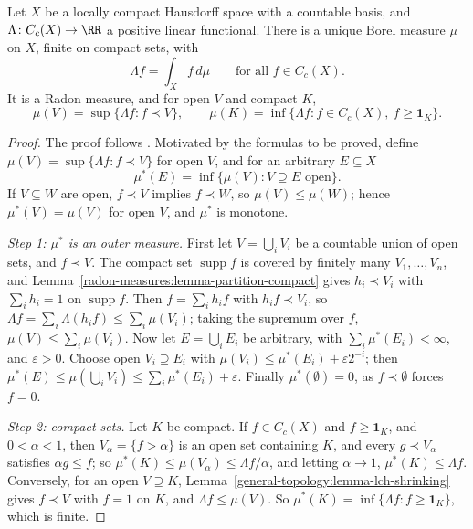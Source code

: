 \begin{theorem}\label{radon-measures:theorem-riesz-markov}
Let $X$ be a locally compact Hausdorff space with a countable basis, and $\Lambda \colon C_c(X) \to \RR$ a positive linear functional. There is a unique Borel measure $\mu$ on $X$, finite on compact
sets, with
\[
\Lambda f = \int_Xf\,d\mu \qquad \text{for all } f \in C_c(X).
\]
It is a Radon measure, and for open $V$ and compact $K$,
\[
\mu(V) = \sup\{\Lambda f : f \prec V\}, \qquad \mu(K) = \inf\{\Lambda f : f \in C_c(X),\ f \geq \mathbf{1}_K\}.
\]
\end{theorem}

\begin{proof}
The proof follows \cite[Theorem 2.14]{rudin-rca}. Motivated by the formulas to be proved, define $\mu(V) = \sup\{\Lambda f : f \prec V\}$ for open $V$, and for an arbitrary $E \subseteq X$
\[
\mu^*(E) = \inf\{\mu(V) : V \supseteq E \text{ open}\}.
\]
If $V \subseteq W$ are open, $f \prec V$ implies $f \prec W$, so $\mu(V) \leq \mu(W)$; hence $\mu^*(V) = \mu(V)$ for open $V$, and $\mu^*$ is monotone.

\emph{Step 1: $\mu^*$ is an outer measure.} First let $V = \bigcup_iV_i$ be a countable union of open sets, and $f \prec V$. The compact set $\operatorname{supp}f$ is covered by finitely many
$V_1, \ldots, V_n$, and Lemma~\ref{radon-measures:lemma-partition-compact} gives $h_i \prec V_i$ with $\sum_ih_i = 1$ on $\operatorname{supp}f$. Then $f = \sum_ih_if$ with $h_if \prec V_i$, so
$\Lambda f = \sum_i\Lambda(h_if) \leq \sum_i\mu(V_i)$; taking the supremum over $f$, $\mu(V) \leq \sum_i\mu(V_i)$. Now let $E = \bigcup_iE_i$ be arbitrary, with $\sum_i\mu^*(E_i) < \infty$, and
$\varepsilon > 0$. Choose open $V_i \supseteq E_i$ with $\mu(V_i) \leq \mu^*(E_i) + \varepsilon2^{-i}$; then
$\mu^*(E) \leq \mu(\bigcup_iV_i) \leq \sum_i\mu^*(E_i) + \varepsilon$. Finally $\mu^*(\emptyset) = 0$, as $f \prec \emptyset$ forces $f = 0$.

\emph{Step 2: compact sets.} Let $K$ be compact. If $f \in C_c(X)$ and $f \geq \mathbf{1}_K$, and $0 < \alpha < 1$, then $V_\alpha = \{f > \alpha\}$ is an open set containing $K$, and every $g \prec V_\alpha$
satisfies $\alpha g \leq f$; so $\mu^*(K) \leq \mu(V_\alpha) \leq \Lambda f/\alpha$, and letting $\alpha \to 1$, $\mu^*(K) \leq \Lambda f$. Conversely, for an open $V \supseteq K$,
Lemma~\ref{general-topology:lemma-lch-shrinking} gives $f \prec V$ with $f = 1$ on $K$, and $\Lambda f \leq \mu(V)$. So $\mu^*(K) = \inf\{\Lambda f : f \geq \mathbf{1}_K\}$, which is finite.


\end{proof}
